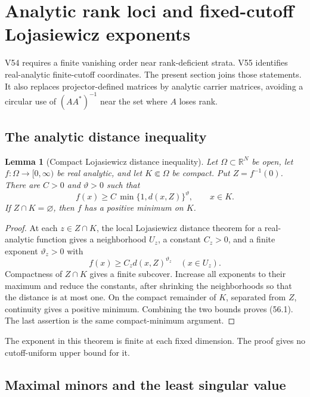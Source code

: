 \documentclass[11pt]{article}
\newtheorem{lemma}[theorem]{Lemma}
\begin{document}
\section{Analytic rank loci and fixed-cutoff Lojasiewicz exponents}
\label{sec:v11v56}

V54 requires a finite vanishing order near rank-deficient strata.
V55 identifies real-analytic finite-cutoff coordinates.  The present
section joins those statements.  It also replaces projector-defined
matrices by analytic carrier matrices, avoiding a circular use of
\((AA^*)^{-1}\) near the set where \(A\) loses rank.

\subsection{The analytic distance inequality}

\begin{lemma}[Compact Lojasiewicz distance inequality]
\label{lem:v11v56-loja}
Let \(\Omega\subset\mathbb R^N\) be open, let
\(f:\Omega\to[0,\infty)\) be real analytic, and let
\(K\Subset\Omega\) be compact.  Put \(Z=f^{-1}(0)\).  There are
\(C>0\) and \(\vartheta>0\) such that
\[
 f(x)\ge C\,\min\{1,d(x,Z)\}^{\vartheta},
                         \qquad x\in K.                       \tag{56.1}
\]
If \(Z\cap K=\varnothing\), then \(f\) has a positive minimum on
\(K\).
\end{lemma}

\begin{proof}
At each \(z\in Z\cap K\), the local Lojasiewicz distance theorem for a
real-analytic function gives a neighborhood \(U_z\), a constant
\(C_z>0\), and a finite exponent \(\vartheta_z>0\) with
\[
 f(x)\ge C_zd(x,Z)^{\vartheta_z}\quad(x\in U_z).
\]
Compactness of \(Z\cap K\) gives a finite subcover.  Increase all
exponents to their maximum and reduce the constants, after shrinking
the neighborhoods so that the distance is at most one.  On the compact
remainder of \(K\), separated from \(Z\), continuity gives a positive
minimum.  Combining the two bounds proves (56.1).  The last assertion
is the same compact-minimum argument.
\end{proof}

The exponent in this theorem is finite at each fixed dimension.  The
proof gives no cutoff-uniform upper bound for it.

\subsection{Maximal minors and the least singular value}
\end{document}

